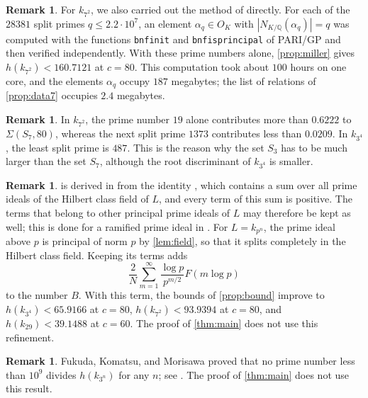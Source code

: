 \documentclass[11pt]{amsart}
\theoremstyle{plain}
\theoremstyle{definition}
\newtheorem{remark}[theorem]{Remark}
\begin{document}
\begin{remark} \label{rem:first}
For $k_{7^2}$, we also carried out the method of \cite{Mi15b} directly.
For each of the $28381$ split primes $q \le 2.2 \cdot 10^7$, an element $\alpha_q \in O_K$ with $|N_{K/\mathbb{Q}}(\alpha_q)| = q$ was computed with the functions \texttt{bnfinit} and \texttt{bnfisprincipal} of PARI/GP and then verified independently.
With these prime numbers alone, \cref{prop:miller} gives $h(k_{7^2}) < 160.7121$ at $c = 80$.
This computation took about $100$ hours on one core, and the elements $\alpha_q$ occupy $187$ megabytes; the list of relations of \cref{prop:data7} occupies $2.4$ megabytes.
\end{remark}

\begin{remark} \label{rem:19}
In $k_{7^2}$, the prime number $19$ alone contributes more than $0.6222$ to $\Sigma(S_7, 80)$, whereas the next split prime $1373$ contributes less than $0.0209$.
In $k_{3^4}$, the least split prime is $487$.
This is the reason why the set $S_3$ has to be much larger than the set $S_7$, although the root discriminant of $k_{3^4}$ is smaller.
\end{remark}

\begin{remark} \label{rem:ramified}
 is derived in \cite{Mi14} from the identity \cite[(4.1)]{Mi14}, which contains a sum over all prime ideals of the Hilbert class field of $L$, and every term of this sum is positive.
The terms that belong to other principal prime ideals of $L$ may therefore be kept as well; this is done for a ramified prime ideal in \cite[Section 6]{Mi14}.
For $L = k_{p^n}$, the prime ideal above $p$ is principal of norm $p$ by \cref{lem:field}, so that it splits completely in the Hilbert class field.
Keeping its terms adds
\[
\frac{2}{N} \sum_{m=1}^{\infty} \frac{\log p}{p^{m/2}} F(m \log p)
\]
to the number $B$.
With this term, the bounds of \cref{prop:bound} improve to $h(k_{3^4}) < 65.9166$ at $c = 80$, $h(k_{7^2}) < 93.9394$ at $c = 80$, and $h(k_{29}) < 39.1488$ at $c = 60$.
The proof of \cref{thm:main} does not use this refinement.
\end{remark}

\begin{remark} \label{rem:fkm}
Fukuda, Komatsu, and Morisawa \cite{FKM14} proved that no prime number less than $10^9$ divides $h(k_{3^n})$ for any $n$; see \cite[Theorem 5]{Mi15b}.
The proof of \cref{thm:main} does not use this result.
\end{remark}
\end{document}
